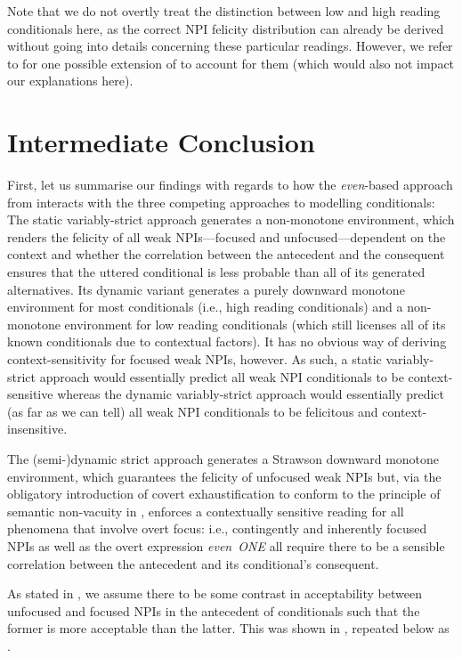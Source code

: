 Note that we do not overtly treat the distinction between low and high reading conditionals here, as the correct NPI felicity distribution can already be derived without going into details concerning these particular readings. However, we refer to \textcite{Walker2015} for one possible extension of \textcite{Fintel2001} to account for them (which would also not impact our explanations here).

\section{Intermediate Conclusion}
First, let us summarise our findings with regards to how the \textit{even}-based approach from  interacts with the three competing approaches to modelling conditionals: The static variably-strict approach generates a non-monotone environment, which renders the felicity of all weak NPIs---focused and unfocused---dependent on the context and whether the correlation between the antecedent and the consequent ensures that the uttered conditional is less probable than all of its generated alternatives. Its dynamic variant generates a purely downward monotone environment for most conditionals (i.e., high reading conditionals) and a non-monotone environment for low reading conditionals (which still licenses all of its known conditionals due to contextual factors). It has no obvious way of deriving context-sensitivity for focused weak NPIs, however. As such, a static variably-strict approach would essentially predict all weak NPI conditionals to be context-sensitive whereas the dynamic variably-strict approach would essentially predict (as far as we can tell) all weak NPI conditionals to be felicitous and context-insensitive.

The (semi-)dynamic strict approach generates a Strawson downward monotone environment, which guarantees the felicity of unfocused weak NPIs but, via the obligatory introduction of covert exhaustification to conform to the principle of semantic non-vacuity in , enforces a contextually sensitive reading for all phenomena that involve overt focus: i.e., contingently and inherently focused NPIs as well as the overt expression \textit{even~ONE} all require there to be a sensible correlation between the antecedent and its conditional's consequent.

As stated in , we assume there to be some contrast in acceptability between unfocused and focused NPIs in the antecedent of conditionals such that the former is more acceptable than the latter. This was shown in , repeated below as .
\begin{table}[!htb]
\end{table}

